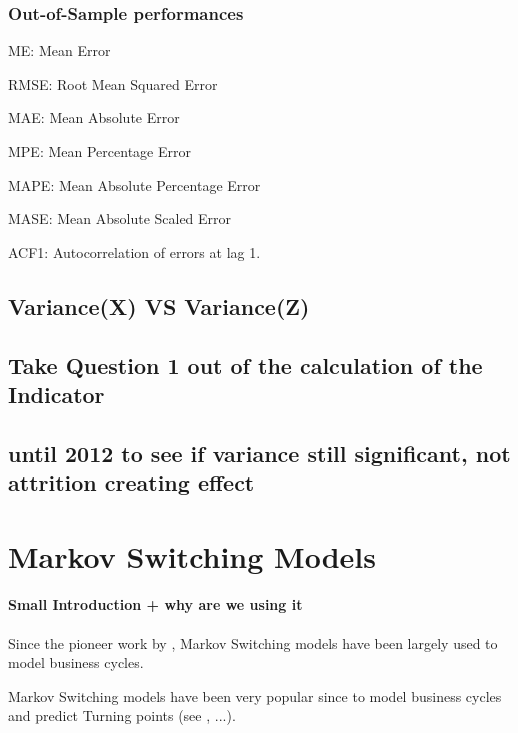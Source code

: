 \documentclass[12pt,a4paper,oneside]{book}
\begin{document}
\subsection{Out-of-Sample performances}


ME: Mean Error

RMSE: Root Mean Squared Error

MAE: Mean Absolute Error

MPE: Mean Percentage Error

MAPE: Mean Absolute Percentage Error

MASE: Mean Absolute Scaled Error

ACF1: Autocorrelation of errors at lag 1.



\newpage



\section{Variance(X) VS Variance(Z)}

\section{Take Question 1 out of the calculation of the Indicator}

\section{until 2012 to see if variance still significant, not attrition creating effect}



\chapter{Markov Switching Models}


\subsubsection{Small Introduction + why are we using it}

Since the pioneer work by \cite{hamilton_new_1989}, Markov Switching models have been largely used to model business cycles.


Markov Switching models have been very popular since \cite{hamilton_new_1989} to model business cycles and predict Turning points (see \cite{duprey_how_2017}, ...).
\end{document}
